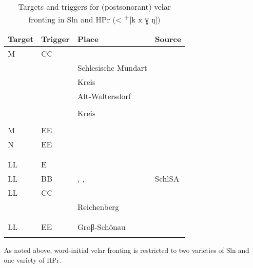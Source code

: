 \begin{table}
\caption{Targets and triggers for (postsonorant) velar fronting in Sln and HPr (< \textsuperscript{+}[k x ɣ ŋ])}
\label{tab:12.12}
\begin{tabularx}{\textwidth}{llQQ}
\lsptoprule
Target & Trigger & Place & Source\\
\midrule
M & CC &         & \citet{Pautsch1901}  \\
  &    &  Schlesische Mundart & \citet{vonUnwert1908}\\
  &    &  Kreis     & \citet{Graebisch1912a}\\
  &    &  Alt-Waltersdorf     & \citet{Graebisch1912b}\\
  &    &         & \citet{Weiser1937}   \\
  &    &  Kreis          & \citet{Halbsguth1938}\\
  &    &      & \citet{Blaschke1966}\\

M & EE &   & \citet{Giernoth1917}\\
N & EE &   & \citet{Michel1891}      \\
  &    &          & \citet{Meiche1898}      \\
  &    &     & \citet{KuckWiesinger1965}\\
LL & E &   & \citet{Rieger1935}\\
LL & BB &  , ,  & SchlSA\\
LL & CC &         & \citet{Hoffmann1906}  \\
   &    &  Reichenberg     &\citet{Kämpf1920}      \\
   &    &      &\citet{Festa1925}      \\
   &    &               &\citet{Messow1965}\\
LL & EE & Groβ-Schönau & \citet{Wenzel1919}\\
\lspbottomrule
\end{tabularx}
\end{table}

As noted above, word-initial velar fronting is restricted to two varieties of Sln and one variety of HPr.

